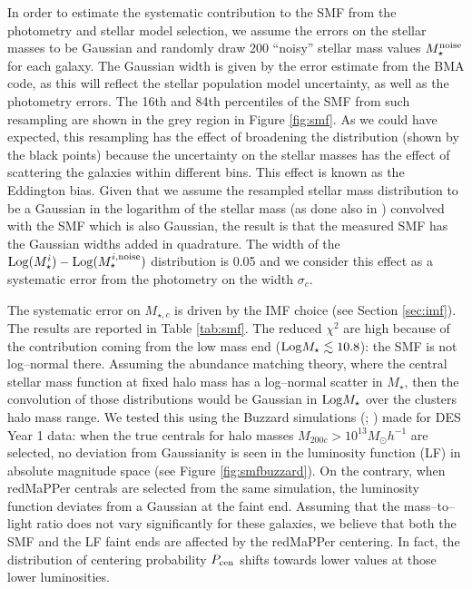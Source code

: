 {In order to estimate the systematic contribution to the SMF from the photometry and stellar model selection, we assume the errors on the stellar masses to be Gaussian and randomly draw 200 ``noisy'' stellar mass values $M_\star^{\rm noise}$ for each galaxy. The Gaussian width is given by the error estimate from the BMA code, as this will reflect the stellar population model uncertainty, as well as the photometry errors. The 16th and 84th percentiles of the SMF from such resampling are shown in the grey region in Figure \ref{fig:smf}. As we could have expected, this resampling has the effect of broadening the distribution (shown by the black points) because the uncertainty on the stellar masses has the effect of scattering the galaxies within different bins. This effect is known as the Eddington bias. Given that we assume the resampled stellar mass distribution to be a Gaussian in the logarithm of the stellar mass (as done also in \citealt{caputi}) convolved with the SMF which is also Gaussian, the result is that the measured SMF has the Gaussian widths added in quadrature. The width of the ${\rm Log}(M^i_\star)-{\rm Log}(M_\star^{i,{\rm noise}})$ distribution is 0.05 and we consider this effect as a systematic error from the photometry on the width $\sigma_c$.

The systematic error on $M_{\star,c}$ is driven by the IMF choice (see Section \ref{sec:imf}). The results are reported in Table \ref{tab:smf}. The reduced $\chi^2$ are high because of the contribution coming from the low mass end (${\rm Log}M_\star\lesssim 10.8$): the SMF is not log--normal there. Assuming the abundance matching theory, where the central stellar mass function at fixed halo mass has a log--normal scatter in $M_\star$, then the convolution of those distributions would be Gaussian in ${\rm Log} M_\star$ over the clusters halo mass range. We tested this using the Buzzard simulations (\citealt{derose}; \citealt{wechsler}) made for DES Year 1 data: when the true centrals for halo masses $M_{200c}>10^{13} M_\odot h^{-1}$ are selected, no deviation from Gaussianity is seen in the luminosity function (LF) in absolute magnitude space (see Figure \ref{fig:smfbuzzard}). On the contrary, when redMaPPer centrals are selected from the same simulation, the luminosity function deviates from a Gaussian at the faint end. Assuming that the mass--to--light ratio does not vary significantly for these galaxies, we believe that both the SMF and the LF faint ends are affected by the redMaPPer centering. In fact, the distribution of centering probability $P_{\rm cen}$ shifts towards lower values at those lower luminosities.

}
